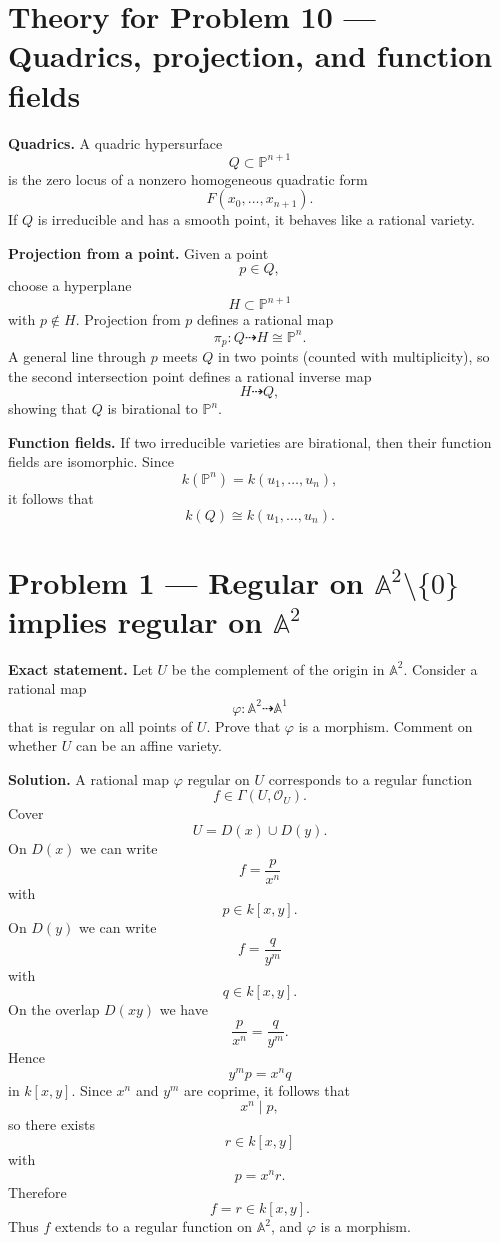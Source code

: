 \documentclass[12pt,a4paper]{article}
\theoremstyle{plain}
\theoremstyle{definition}      %
\begin{document}
\section*{Theory for Problem 10 — Quadrics, projection, and function fields}

\textbf{Quadrics.}
A quadric hypersurface
\[
Q\subset \mathbb{P}^{n+1}
\]
is the zero locus of a nonzero homogeneous quadratic form
\[
F(x_0,\dots,x_{n+1}).
\]
If $Q$ is irreducible and has a smooth point, it behaves like a rational variety.

\textbf{Projection from a point.}
Given a point
\[
p\in Q,
\]
choose a hyperplane
\[
H\subset \mathbb{P}^{n+1}
\]
with $p\notin H$.
Projection from $p$ defines a rational map
\[
\pi_p:Q\dashrightarrow H\cong \mathbb{P}^n.
\]
A general line through $p$ meets $Q$ in two points (counted with multiplicity), so the second intersection point defines a rational inverse map
\[
H\dashrightarrow Q,
\]
showing that $Q$ is birational to $\mathbb{P}^n$.

\textbf{Function fields.}
If two irreducible varieties are birational, then their function fields are isomorphic.
Since
\[
k(\mathbb{P}^n)=k(u_1,\dots,u_n),
\]
it follows that
\[
k(Q)\cong k(u_1,\dots,u_n).
\]


\section*{Problem 1 — Regular on \(\mathbb A^2\setminus\{0\}\) implies regular on \(\mathbb A^2\)}

\textbf{Exact statement.}
Let \(U\) be the complement of the origin in \(\mathbb A^2\).
Consider a rational map
\[
\varphi:\mathbb A^2\dashrightarrow \mathbb A^1
\]
that is regular on all points of \(U\).
Prove that \(\varphi\) is a morphism.
Comment on whether \(U\) can be an affine variety.

\textbf{Solution.}
A rational map \(\varphi\) regular on \(U\) corresponds to a regular function
\[
f\in \Gamma(U,\mathcal O_U).
\]
Cover
\[
U=D(x)\cup D(y).
\]
On \(D(x)\) we can write
\[
f=\frac{p}{x^n}
\]
with
\[
p\in k[x,y].
\]
On \(D(y)\) we can write
\[
f=\frac{q}{y^m}
\]
with
\[
q\in k[x,y].
\]
On the overlap \(D(xy)\) we have
\[
\frac{p}{x^n}=\frac{q}{y^m}.
\]
Hence
\[
y^m p=x^n q
\]
in \(k[x,y]\).
Since \(x^n\) and \(y^m\) are coprime, it follows that
\[
x^n \mid p,
\]
so there exists
\[
r\in k[x,y]
\]
with
\[
p=x^n r.
\]
Therefore
\[
f=r\in k[x,y].
\]
Thus \(f\) extends to a regular function on \(\mathbb A^2\), and \(\varphi\) is a morphism.
\end{document}
